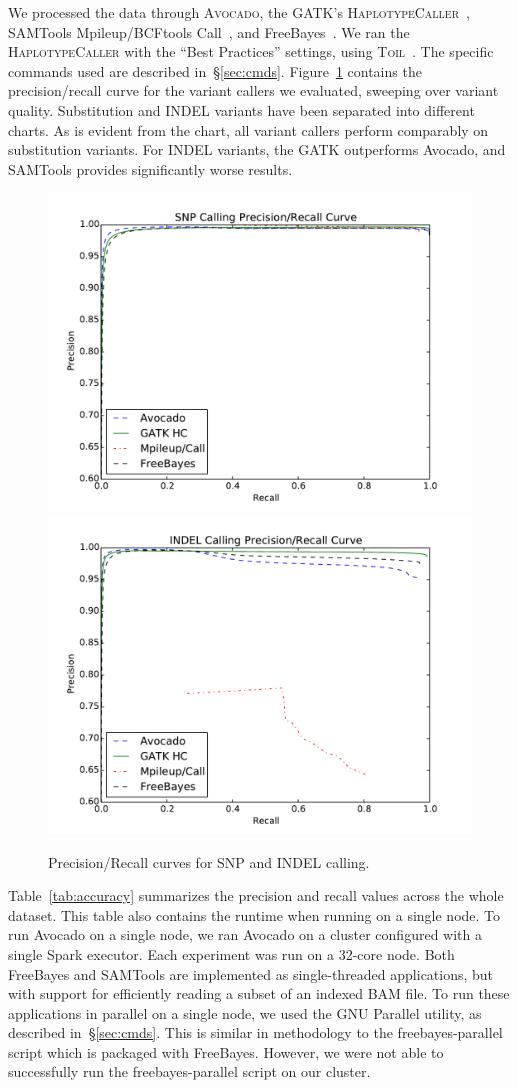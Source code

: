 \documentclass[phd]{ucbthesis}
\begin{document}
We processed the data through \textsc{Avocado}, the \textsc{GATK}'s
\textsc{HaplotypeCaller}~\cite{depristo11}, SAMTools Mpileup/BCFtools
Call~\cite{li11}, and FreeBayes~\cite{garrison12}. We ran the
\textsc{HaplotypeCaller} with the ``Best Practices'' settings, using
\textsc{Toil}~\cite{vivian17}. The specific commands used are described
in~\S\ref{sec:cmds}. Figure~\ref{fig:precision-recall} contains the
precision/recall curve for the variant callers we evaluated, sweeping
over variant quality. Substitution and INDEL variants have been separated into
different charts. As is evident from the chart, all variant callers perform
comparably on substitution variants. For INDEL variants, the GATK outperforms
Avocado, and SAMTools provides significantly worse results.

\begin{figure}[h]
  \begin{center}
    \includegraphics[width=0.45\linewidth]{graphs/roc/snp.pdf}
    \includegraphics[width=0.45\linewidth]{graphs/roc/indel.pdf}
  \end{center}
  \caption{Precision/Recall curves for SNP and INDEL calling.}
  \label{fig:precision-recall}
\end{figure}

Table~\ref{tab:accuracy} summarizes the precision and recall values across the
whole dataset. This table also contains the runtime when running on a single
node. To run Avocado on a single node, we ran Avocado on a cluster configured
with a single Spark executor. Each experiment was run on a 32-core node. Both
FreeBayes and SAMTools are implemented as single-threaded applications, but
with support for efficiently reading a subset of an indexed BAM file. To run
these applications in parallel on a single node, we used the GNU Parallel
utility, as described in~\S\ref{sec:cmds}. This is similar in methodology to
the freebayes-parallel script which is packaged with FreeBayes. However, we
were not able to successfully run the freebayes-parallel script on our
cluster.
\end{document}
